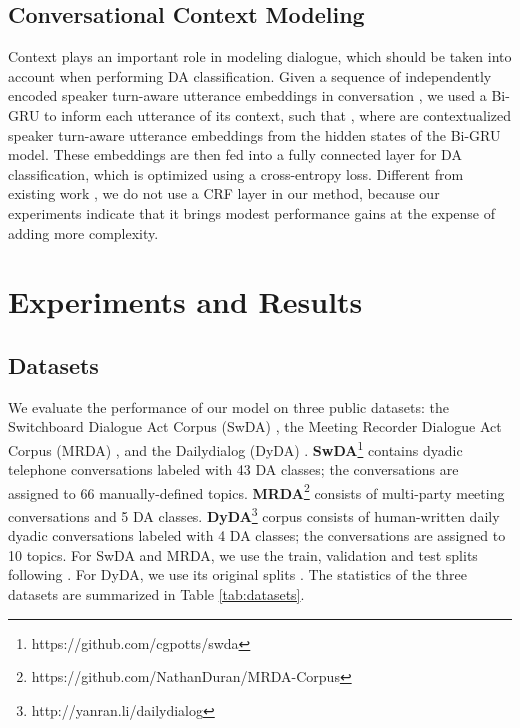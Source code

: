 \documentclass[11pt]{article}
\begin{document}
\subsection{Conversational Context Modeling}
Context plays an important role in modeling dialogue, which should be taken into account when performing DA classification. Given a sequence of independently encoded speaker turn-aware utterance embeddings  in conversation , we used a Bi-GRU \cite{cho2014properties} to inform each utterance of its context, such that
,
where  are contextualized speaker turn-aware utterance embeddings from the hidden states of the Bi-GRU model. These embeddings are then fed into a fully connected layer for DA classification, which is optimized using a cross-entropy loss. Different from existing work \cite{raheja2019dialogue, li2018dual, wan2018improved, chen2018dialogue, kumar2018dialogue, bothe2018context}, we do not use a CRF layer in our method, because our experiments indicate that it brings modest performance gains at the expense of adding more complexity.


\section{Experiments and Results}
\subsection{Datasets}
We evaluate the performance of our model on three public datasets: the Switchboard Dialogue Act Corpus (SwDA) \cite{jurafsky1997switchboard, shriberg1998can, stolcke2000dialogue}, the Meeting Recorder Dialogue Act Corpus (MRDA) \cite{shriberg2004icsi}, and the Dailydialog (DyDA) \cite{li2017dailydialog}. \textbf{SwDA}\footnote{https://github.com/cgpotts/swda} contains dyadic telephone conversations labeled with 43 DA classes; the conversations are assigned to 66 manually-defined topics. \textbf{MRDA}\footnote{https://github.com/NathanDuran/MRDA-Corpus} consists of multi-party meeting conversations and 5 DA classes. \textbf{DyDA}\footnote{http://yanran.li/dailydialog} corpus consists of human-written daily dyadic conversations labeled with 4 DA classes; the conversations are assigned to 10 topics. For SwDA and MRDA, we use the train, validation and test splits following \cite{lee2016sequential}. For DyDA, we use its original splits \cite{li2017dailydialog}. The statistics of the three datasets are summarized in Table \ref{tab:datasets}.
\end{document}
